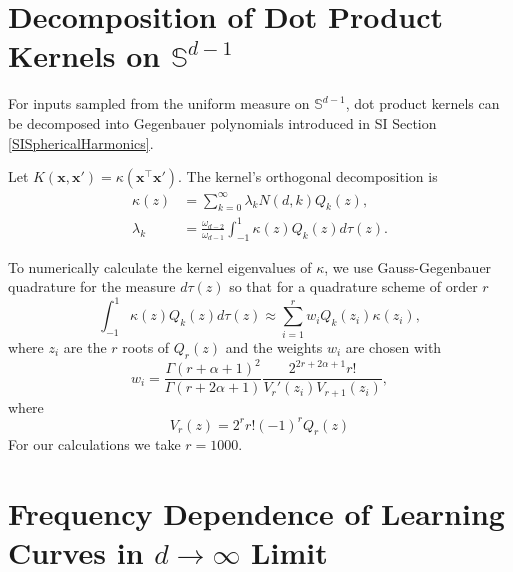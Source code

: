 \documentclass{article}
\begin{document}
\section{Decomposition of Dot Product Kernels on $\mathbb{S}^{d-1}$}\label{SIDotProductKernels}

For inputs sampled from the uniform measure on $\mathbb{S}^{d-1}$, dot product kernels can be decomposed into Gegenbauer polynomials introduced in SI Section \ref{SISphericalHarmonics}. 

Let $K(\mathbf{x},\mathbf{x}') = \kappa(\mathbf{x}^\top \mathbf{x}')$. The kernel's orthogonal decomposition is 
\begin{align}
    \kappa(z) &= \sum_{k=0}^\infty \lambda_k N(d,k) Q_{k}(z), \nonumber
    \\
    \lambda_k &= \frac{\omega_{d-2}}{\omega_{d-1}} \int_{-1}^1 \kappa(z) Q_{k}(z) d\tau(z). 
\end{align}

To numerically calculate the kernel eigenvalues of $\kappa$, we use Gauss-Gegenbauer quadrature \cite{abramowitz_stegun} for the measure $d\tau(z)$ so that for a quadrature scheme of order $r$
%
\begin{equation}
    \int_{-1}^1 \kappa(z) Q_{k}(z) d\tau(z) \approx \sum_{i=1}^r w_i Q_{k}(z_i) \kappa(z_i),
\end{equation}
%
where $z_i$ are the $r$ roots of $Q_r(z)$ and the weights $w_i$ are chosen with 
\begin{equation}
    w_i = \frac{\Gamma(r+\alpha +1)^2}{\Gamma(r+2\alpha+1)} \frac{2^{2r+2\alpha+1}r!}{V_r'(z_i) V_{r+1}(z_i)},
\end{equation}
%
where 
%
\begin{equation}
    V_r(z) = 2^r r! (-1)^r Q_r(z)
\end{equation}
%
For our calculations we take $r=1000$.


\section{Frequency Dependence of Learning Curves in $d\to\infty$ Limit}\label{SIFrequencyDependence}
\end{document}
